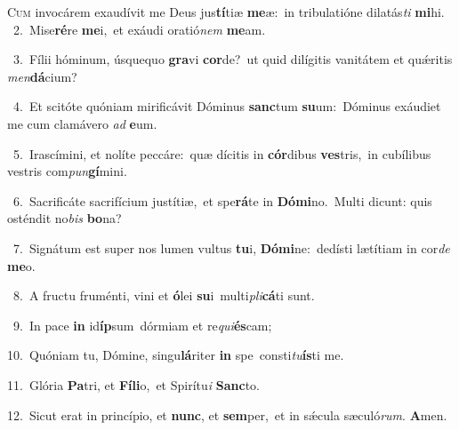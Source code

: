 \lettrine{\initial\textcolor{\initialcolor}{C}}{um} invocárem exaudívit me Deus jus\-\textbf{tí}\-tiæ \textbf{me}\-æ:~\star in tribulatióne dilatás\textit{ti} \textbf{mi}\-hi.\\
{\numbfont\textcolor{\numbcolor}{~2.}}~Mise\-\textbf{ré}\-re \textbf{me}\-i,~\star et exáudi oratió\textit{nem} \textbf{me}\-am.\par
{\numbfont\textcolor{\numbcolor}{~3.}}~Fílii hóminum, úsquequo \textbf{gra}\-vi \textbf{cor}\-de?~\star ut quid dilígitis vanitátem et quǽritis \textit{men}\-\textbf{dá}cium?\par
{\numbfont\textcolor{\numbcolor}{~4.}}~Et scitóte quóniam mirificávit Dóminus \textbf{sanc}\-tum \textbf{su}\-um:~\star Dóminus exáudiet me cum clamávero \textit{ad} \textbf{e}\-um.\par
{\numbfont\textcolor{\numbcolor}{~5.}}~Irascímini, et nolíte peccáre:~\dagger quæ dícitis in \textbf{cór}\-dibus \textbf{ves}\-tris,~\star in cubílibus vestris com\-\textit{pun}\-\textbf{gí}mini.\par
{\numbfont\textcolor{\numbcolor}{~6.}}~Sacrificáte sacrifícium justítiæ,~\dagger et spe\-\textbf{rá}\-te in \textbf{Dó}\-\textbf{mi}no.~\star Multi dicunt: quis osténdit no\textit{bis} \textbf{bo}\-na?\par
{\numbfont\textcolor{\numbcolor}{~7.}}~Signátum est super nos lumen vultus \textbf{tu}\-i, \textbf{Dó}\-\textbf{mi}ne:~\star dedísti lætítiam in cor\textit{de} \textbf{me}\-o.\par
{\numbfont\textcolor{\numbcolor}{~8.}}~A fructu fruménti, vini et \textbf{ó}\-lei \textbf{su}\-i~\star multi\-\textit{pli}\-\textbf{cá}ti sunt.\par
{\numbfont\textcolor{\numbcolor}{~9.}}~In pace \textbf{in} id\-\textbf{íp}\-sum~\star dórmiam et re\-\textit{qui}\-\textbf{és}cam;\par
{\numbfont\textcolor{\numbcolor}{10.}}~Quóniam tu, Dómine, singu\-\textbf{lá}\-riter \textbf{in} spe~\star consti\-\textit{tu}\-\textbf{ís}ti me.\par
{\numbfont\textcolor{\numbcolor}{11.}}~Glória \textbf{Pa}\-tri, et \textbf{Fí}\-\textbf{li}o,~\star et Spirítu\textit{i} \textbf{Sanc}\-to.\par
{\numbfont\textcolor{\numbcolor}{12.}}~Sicut erat in princípio, et \textbf{nunc}\-, et \textbf{sem}\-per,~\star et in sǽcula sæculó\-\textit{rum}\-. \textbf{A}\-men.\par
